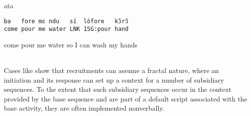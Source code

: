 \documentclass[output=paper]{langsci/langscibook}
\begin{document}
\vspace{2mm}
%
\begin{transbox}{1}{ata}
\begin{verbatim}
ba   fore mɛ ndu   sí  lòfore   kɔ̃rɔ̃
come pour me water LNK 1SG:pour hand
\end{verbatim}
come pour me water so I can wash my hands
\end{transbox}
%
%
\vspace{2mm}
%
\begin{mdframednoverticalspace}[style=firstfoc]
\end{mdframednoverticalspace}
%
\begin{mdframednoverticalspace}[style=secondfoc]
\end{mdframednoverticalspace}
%
%
\begin{mdframednoverticalspace}[style=firstfoc]
\end{mdframednoverticalspace}
%
\begin{mdframednoverticalspace}[style=secondfoc]
\end{mdframednoverticalspace}
%
\vspace{-1mm}
%
\\

\normalsize
Cases like  show that recruitments can assume a fractal nature, where an initiation and its response can set up a context for a number of subsidiary sequences. To the extent that such subsidiary sequences occur in the context provided by the base sequence and are part of a default script associated with the base activity, they are often implemented nonverbally.
\end{document}
